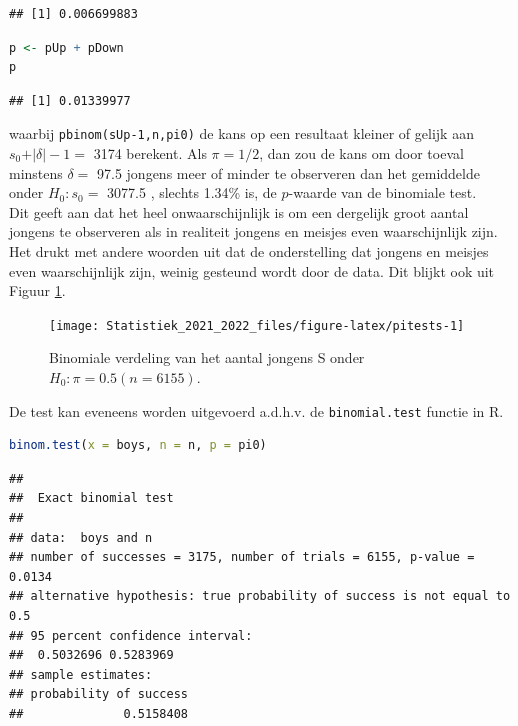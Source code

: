 \documentclass[
  12pt,dutch,coursenotes]{book}
\newcommand{\passthrough}[1]{#1}
\theoremstyle{definition}
\theoremstyle{definition}
\theoremstyle{definition}
\theoremstyle{definition}
\theoremstyle{remark}
\begin{document}
\begin{lstlisting}
## [1] 0.006699883
\end{lstlisting}

\begin{lstlisting}[language=R]
p <- pUp + pDown
p
\end{lstlisting}

\begin{lstlisting}
## [1] 0.01339977
\end{lstlisting}

waarbij \passthrough{\lstinline!pbinom(sUp-1,n,pi0)!} de kans op een resultaat kleiner of gelijk aan \(s_0+\vert \delta\vert -1 =\) 3174 berekent.
Als \(\pi= 1/2\), dan zou de kans om door toeval minstens \(\delta=\) 97.5 jongens meer of minder te observeren dan het gemiddelde onder \(H_0: s_0=\) 3077.5 , slechts 1.34\% is, de \(p\)-waarde van de binomiale test.\\
Dit geeft aan dat het heel onwaarschijnlijk is om een dergelijk groot aantal jongens te
observeren als in realiteit jongens en meisjes even waarschijnlijk zijn.
Het drukt
met andere woorden uit dat de onderstelling dat jongens en meisjes even waarschijnlijk zijn, weinig gesteund wordt door de data.
Dit blijkt ook uit Figuur \ref{fig:pitests}.

\begin{figure}

{\centering \texttt{[image: Statistiek\_2021\_2022\_files/figure-latex/pitests-1]} 

}

\caption{Binomiale verdeling van het aantal jongens S onder $H_0: \pi=0.5 (n=6155)$.}\label{fig:pitests}
\end{figure}

De test kan eveneens worden uitgevoerd a.d.h.v. de \passthrough{\lstinline!binomial.test!} functie in R.

\begin{lstlisting}[language=R]
binom.test(x = boys, n = n, p = pi0)
\end{lstlisting}

\begin{lstlisting}
## 
##  Exact binomial test
## 
## data:  boys and n
## number of successes = 3175, number of trials = 6155, p-value = 0.0134
## alternative hypothesis: true probability of success is not equal to 0.5
## 95 percent confidence interval:
##  0.5032696 0.5283969
## sample estimates:
## probability of success 
##              0.5158408
\end{lstlisting}
\end{document}

